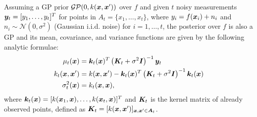 Assuming a GP prior $\mathcal{GP}(0, k(\bm{x}, \bm{x}'))$ over $f$ and given
$t$ noisy measurements $\bm{y}_t = [y_1,\ldots,y_t]^T$ for
points in $A_t = \{x_1,\ldots,x_t\}$,
where $y_i = f(\bm{x}_i) + n_i$ and
${n_i \sim \mathcal{N}(0, \sigma^2)}$ (Gaussian i.i.d. noise)
for $i = 1,\ldots,t$, the posterior over $f$ is also a
GP and its mean, covariance, and variance functions are given by the
following analytic formulae:
\begin{align}
\mu_t(\bm{x}) &= \bm{k}_t(\bm{x})^T\left(\bm{K}_t + \sigma^2 \bm{I}\right)^{-1}\bm{y}_t\label{eq:mean}\\
k_t(\bm{x}, \bm{x}') &= k(\bm{x}, \bm{x}') - \bm{k}_t(\bm{x})^T\left(\bm{K}_t + \sigma^2 \bm{I}\right)^{-1}\bm{k}_t(\bm{x})\notag\\
\sigma_t^2(\bm{x}) &= k_t(\bm{x}, \bm{x})\label{eq:var},
\end{align}
where $\bm{k}_t(\bm{x}) = [k(\bm{x}_1, \bm{x}),\ldots,k(\bm{x}_t, \bm{x})]^T$ and $\bm{K}_t$ is
the kernel matrix of already observed points, defined as
${\bm{K}_t = [k(\bm{x}, \bm{x}')]_{\bm{x}, \bm{x}'\in\bm{A}_t}}$.
